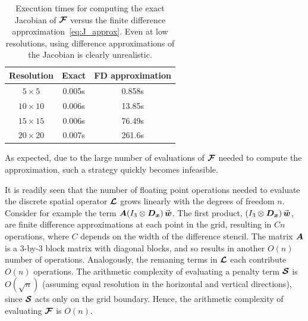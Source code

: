 \begin{table}[ht]
  \centering
  \begin{tabular}{|c|c|c|}
    \hline
    Resolution & Exact & FD approximation \\
    \hline
    $5 \times 5$ & 0.005s & 0.858s \\
    $10 \times 10$ & 0.006s & 13.85s \\
    $15 \times 15$ & 0.006s & 76.49s \\
    $20 \times 20$ & 0.007s & 261.6s \\
    \hline
  \end{tabular}
  \caption{Execution times for computing the exact Jacobian of $\bm{\mathcal{F}}$ versus the finite difference approximation~\eqref{eq:J_approx}. Even at low resolutions, using difference approximations of the Jacobian is clearly unrealistic.}
  \label{tab:efficiency}
\end{table}

As expected, due to the large number of evaluations of $\bm{\mathcal{F}}$ needed to compute the approximation, such a strategy quickly becomes infeasible.

It is readily seen that the number of floating point operations needed to evaluate the discrete spatial operator $\bm{\mathcal{L}}$ grows linearly with the degrees of freedom $n$. Consider for example the term $\An(I_3 \otimes \Dx)\wn$. The first product, $(I_3 \otimes \Dx) \wn$, are finite difference approximations at each point in the grid, resulting in $Cn$ operations, where $C$ depends on the width of the difference stencil. The matrix $\bm{A}$ is a $3$-by-$3$ block matrix with diagonal blocks, and so results in another $O(n)$ number of operations. Analogously, the remaning terms in $\bm{\mathcal{L}}$ each contribute $O(n)$ operations. The arithmetic complexity of evaluating a penalty term $\bm{\mathcal{S}}$ is $O(\sqrt{n})$ (assuming equal resolution in the horizontal and vertical directions), since $\bm{\mathcal{S}}$ acts only on the grid boundary. Hence, the arithmetic complexity of evaluating $\bm{\mathcal{F}}$ is $O(n)$.

